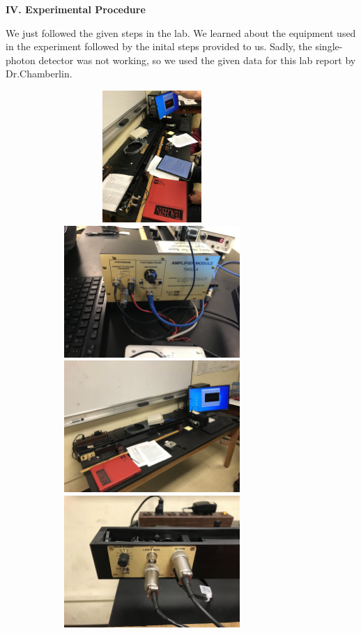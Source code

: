 \documentclass[fleqn]{article}
\begin{document}
  
  \pagebreak


  \textbf{IV. Experimental Procedure}

  \vspace{10px}

  We just followed the given steps in the lab. We learned about the equipment used in the experiment followed
  by the inital steps provided to us. Sadly, the single-photon detector was not working, so 
  we used the given data for this lab report by Dr.Chamberlin. \textcite{Four} 
  
  \begin{figure}[h!]
    \includegraphics[height=5cm, width=9cm]{2 (1).jpg}
    \includegraphics[height=5cm, width=9cm]{2 (2).jpg}
    \includegraphics[height=5cm, width=9cm]{2 (3).jpg}
    \includegraphics[height=5cm, width=9cm]{2 (4).jpg}

\end{figure}
\end{document}
